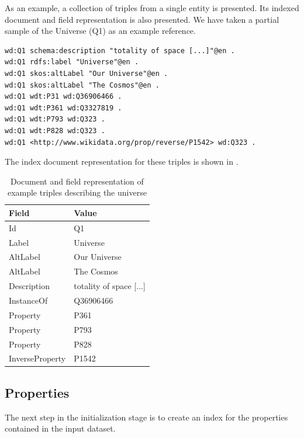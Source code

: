 \begin{example}
As an example, a collection of triples from a single entity is presented. Its indexed document and field representation is also presented. We have taken a partial sample of the Universe (Q1) as an example reference.

\begin{verbatim}
wd:Q1 schema:description "totality of space [...]"@en .
wd:Q1 rdfs:label "Universe"@en .
wd:Q1 skos:altLabel "Our Universe"@en .
wd:Q1 skos:altLabel "The Cosmos"@en .
wd:Q1 wdt:P31 wd:Q36906466 .
wd:Q1 wdt:P361 wd:Q3327819 .
wd:Q1 wdt:P793 wd:Q323 .
wd:Q1 wdt:P828 wd:Q323 .
wd:Q1 <http://www.wikidata.org/prop/reverse/P1542> wd:Q323 .
\end{verbatim}

The index document representation for these triples is shown in .

\begin{table}[h!]
\centering
\begin{tabular}{ll}
Field           & Value                    \\ 
\hline
Id              & Q1                       \\
Label           & Universe                 \\
AltLabel        & Our Universe             \\
AltLabel        & The Cosmos               \\
Description     & totality of space [...]  \\
InstanceOf      & Q36906466                \\
Property        & P361                     \\
Property        & P793                     \\
Property        & P828                     \\
InverseProperty & P1542                   
\end{tabular}
\caption{Document and field representation of example triples describing the universe}
\label{table:triplesToDocument}

\end{table}

\end{example}

\subsection{Properties}
The next step in the initialization stage is to create an index for the properties contained in the input dataset.

